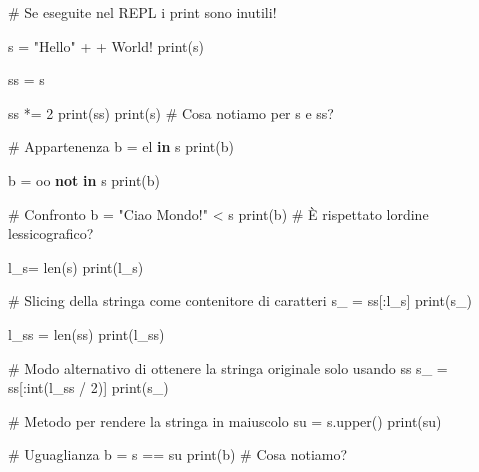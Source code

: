 \documentclass[
  letterpaper,
]{scrbook}
\newenvironment{Shaded}{\begin{snugshade}}{\end{snugshade}}
\newcommand{\BuiltInTok}[1]{\textcolor[rgb]{0.00,0.23,0.31}{#1}}
\newcommand{\CommentTok}[1]{\textcolor[rgb]{0.37,0.37,0.37}{#1}}
\newcommand{\DecValTok}[1]{\textcolor[rgb]{0.68,0.00,0.00}{#1}}
\newcommand{\KeywordTok}[1]{\textcolor[rgb]{0.00,0.23,0.31}{\textbf{#1}}}
\newcommand{\NormalTok}[1]{\textcolor[rgb]{0.00,0.23,0.31}{#1}}
\newcommand{\OperatorTok}[1]{\textcolor[rgb]{0.37,0.37,0.37}{#1}}
\newcommand{\StringTok}[1]{\textcolor[rgb]{0.13,0.47,0.30}{#1}}
\begin{document}
\begin{Shaded}
\begin{Highlighting}[]
\CommentTok{\# Se eseguite nel REPL i print sono inutili!}

\NormalTok{s }\OperatorTok{=} \StringTok{"Hello"} \OperatorTok{+} \StringTok{\textquotesingle{} \textquotesingle{}} \OperatorTok{+} \StringTok{\textquotesingle{}World!\textquotesingle{}}
\BuiltInTok{print}\NormalTok{(s)}

\NormalTok{ss }\OperatorTok{=}\NormalTok{ s}

\NormalTok{ss }\OperatorTok{*=} \DecValTok{2}
\BuiltInTok{print}\NormalTok{(ss)}
\BuiltInTok{print}\NormalTok{(s) }\CommentTok{\# Cosa notiamo per s e ss?}

\CommentTok{\# Appartenenza}
\NormalTok{b }\OperatorTok{=} \StringTok{\textquotesingle{}el\textquotesingle{}} \KeywordTok{in}\NormalTok{ s}
\BuiltInTok{print}\NormalTok{(b) }

\NormalTok{b }\OperatorTok{=} \StringTok{\textquotesingle{}oo\textquotesingle{}} \KeywordTok{not} \KeywordTok{in}\NormalTok{ s}
\BuiltInTok{print}\NormalTok{(b)}

\CommentTok{\# Confronto}
\NormalTok{b }\OperatorTok{=} \StringTok{"Ciao Mondo!"} \OperatorTok{\textless{}}\NormalTok{ s }
\BuiltInTok{print}\NormalTok{(b) }\CommentTok{\# È rispettato l\textquotesingle{}ordine lessicografico?}

\NormalTok{l\_s}\OperatorTok{=} \BuiltInTok{len}\NormalTok{(s)}
\BuiltInTok{print}\NormalTok{(l\_s)}

\CommentTok{\# Slicing della stringa come contenitore di caratteri}
\NormalTok{s\_ }\OperatorTok{=}\NormalTok{ ss[:l\_s] }
\BuiltInTok{print}\NormalTok{(s\_) }

\NormalTok{l\_ss }\OperatorTok{=} \BuiltInTok{len}\NormalTok{(ss) }
\BuiltInTok{print}\NormalTok{(l\_ss)}

\CommentTok{\# Modo alternativo di ottenere la stringa originale solo usando ss}
\NormalTok{s\_ }\OperatorTok{=}\NormalTok{ ss[:}\BuiltInTok{int}\NormalTok{(l\_ss }\OperatorTok{/} \DecValTok{2}\NormalTok{)] }
\BuiltInTok{print}\NormalTok{(s\_) }

\CommentTok{\# Metodo per rendere la stringa in maiuscolo}
\NormalTok{su }\OperatorTok{=}\NormalTok{ s.upper()}
\BuiltInTok{print}\NormalTok{(su)}

\CommentTok{\# Uguaglianza}
\NormalTok{b }\OperatorTok{=}\NormalTok{ s }\OperatorTok{==}\NormalTok{ su}
\BuiltInTok{print}\NormalTok{(b) }\CommentTok{\# Cosa notiamo?}
\end{Highlighting}
\end{Shaded}
\end{document}
